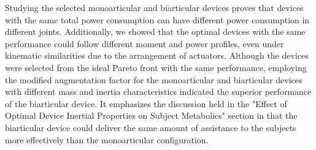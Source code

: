\documentclass[10pt,letterpaper]{article}
\begin{document}
Studying the selected monoarticular and biarticular devices proves that devices with the same total power consumption can have different power consumption in different joints. Additionally, we showed that the optimal devices with the same performance could follow different moment and power profiles, even under kinematic similarities due to the arrangement of actuators. Although the devices were selected from the ideal Pareto front with the same performance, employing the modified augmentation factor for the monoarticular and biarticular devices with different mass and inertia characteristics indicated the superior performance of the biarticular device. It emphasizes the discussion held in the "Effect of Optimal Device Inertial Properties on Subject Metabolics" section in that the biarticular device could deliver the same amount of assistance to the subjects more effectively than the monoarticular configuration.\\
\end{document}
